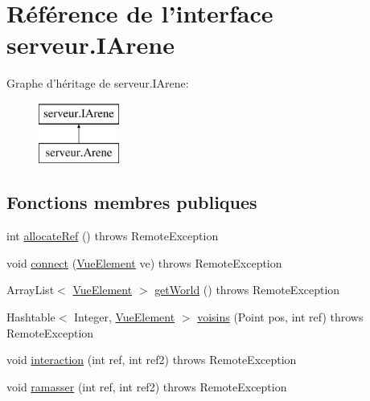 \hypertarget{interfaceserveur_1_1_i_arene}{\section{Référence de l'interface serveur.\-I\-Arene}
\label{interfaceserveur_1_1_i_arene}
}
Graphe d'héritage de serveur.\-I\-Arene\-:\begin{figure}[H]
\begin{center}
\leavevmode
\includegraphics[height=2.000000cm]{interfaceserveur_1_1_i_arene}
\end{center}
\end{figure}
\subsection*{Fonctions membres publiques}
\begin{DoxyCompactItemize}
\item 
int \hyperlink{interfaceserveur_1_1_i_arene_a6dc6a07ca0fdb5c2fd1ba53edd132298}{allocate\-Ref} ()  throws Remote\-Exception
\item 
void \hyperlink{interfaceserveur_1_1_i_arene_a5a051d16e51b7a0f368c4f89401a0293}{connect} (\hyperlink{classinterface_graphique_1_1_vue_element}{Vue\-Element} ve)  throws Remote\-Exception
\item 
Array\-List$<$ \hyperlink{classinterface_graphique_1_1_vue_element}{Vue\-Element} $>$ \hyperlink{interfaceserveur_1_1_i_arene_ab7ea50f885f2cf28628d1c7ce2ca0159}{get\-World} ()  throws Remote\-Exception
\item 
Hashtable$<$ Integer, \hyperlink{classinterface_graphique_1_1_vue_element}{Vue\-Element} $>$ \hyperlink{interfaceserveur_1_1_i_arene_a47a37dbadfd6418b184e2c9f41faec01}{voisins} (Point pos, int ref)  throws Remote\-Exception
\item 
void \hyperlink{interfaceserveur_1_1_i_arene_aec66c3ded2467e80685b8cb4cf856cbc}{interaction} (int ref, int ref2)  throws Remote\-Exception
\item 
void \hyperlink{interfaceserveur_1_1_i_arene_adc0a9a0ec4b423e5b6a13a90091ead8c}{ramasser} (int ref, int ref2)  throws Remote\-Exception
\end{DoxyCompactItemize}


